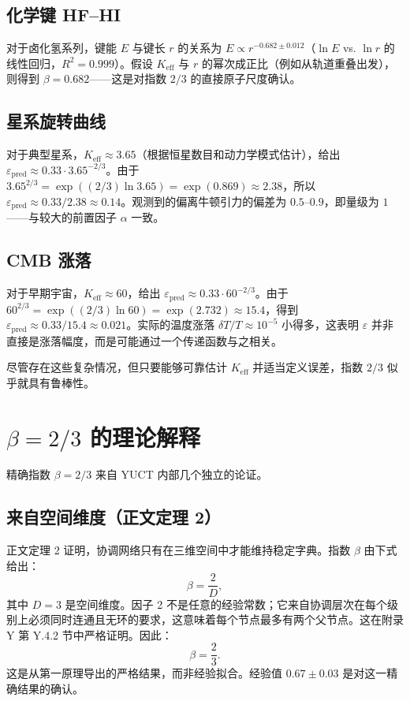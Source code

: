 \documentclass[12pt]{article}
\newcommand{\Keff}{K_{\mathrm{eff}}}
\newcommand{\eps}{\varepsilon}
\begin{document}
	\subsection*{化学键 HF–HI}
	对于卤化氢系列，键能 \(E\) 与键长 \(r\) 的关系为 \(E \propto r^{-0.682 \pm 0.012}\)（\(\ln E\) vs. \(\ln r\) 的线性回归，\(R^2 = 0.999\)）。假设 \(\Keff\) 与 \(r\) 的幂次成正比（例如从轨道重叠出发），则得到 \(\beta = 0.682\)——这是对指数 \(2/3\) 的直接原子尺度确认。
	
	\subsection*{星系旋转曲线}
	对于典型星系，\(\Keff \approx 3.65\)（根据恒星数目和动力学模式估计），给出 \(\eps_{\text{pred}} \approx 0.33 \cdot 3.65^{-2/3}\)。由于 \(3.65^{2/3} = \exp((2/3)\ln 3.65) = \exp(0.869) \approx 2.38\)，所以 \(\eps_{\text{pred}} \approx 0.33/2.38 \approx 0.14\)。观测到的偏离牛顿引力的偏差为 \(0.5\)–\(0.9\)，即量级为 \(1\)——与较大的前置因子 \(\alpha\) 一致。
	
	\subsection*{CMB 涨落}
	对于早期宇宙，\(\Keff \approx 60\)，给出 \(\eps_{\text{pred}} \approx 0.33 \cdot 60^{-2/3}\)。由于 \(60^{2/3} = \exp((2/3)\ln 60) = \exp(2.732) \approx 15.4\)，得到 \(\eps_{\text{pred}} \approx 0.33/15.4 \approx 0.021\)。实际的温度涨落 \(\delta T/T \approx 10^{-5}\) 小得多，这表明 \(\eps\) 并非直接是涨落幅度，而是可能通过一个传递函数与之相关。
	
	尽管存在这些复杂情况，但只要能够可靠估计 \(\Keff\) 并适当定义误差，指数 \(2/3\) 似乎就具有鲁棒性。
	
	\section{\(\beta = 2/3\) 的理论解释}
	\label{sec:derivation}
	
	精确指数 \(\beta = 2/3\) 来自 YUCT 内部几个独立的论证。
	
	\subsection*{来自空间维度（正文定理 2）}
	正文定理 2 证明，协调网络只有在三维空间中才能维持稳定字典。指数 \(\beta\) 由下式给出：
	\[
	\beta = \frac{2}{D},
	\]
	其中 \(D = 3\) 是空间维度。因子 2 不是任意的经验常数；它来自协调层次在每个级别上必须同时连通且无环的要求，这意味着每个节点最多有两个父节点。这在附录 Y 第 Y.4.2 节中严格证明。因此：
	\[
	\beta = \frac{2}{3}.
	\]
	这是从第一原理导出的严格结果，而非经验拟合。经验值 \(0.67 \pm 0.03\) 是对这一精确结果的确认。
	
\end{document}
